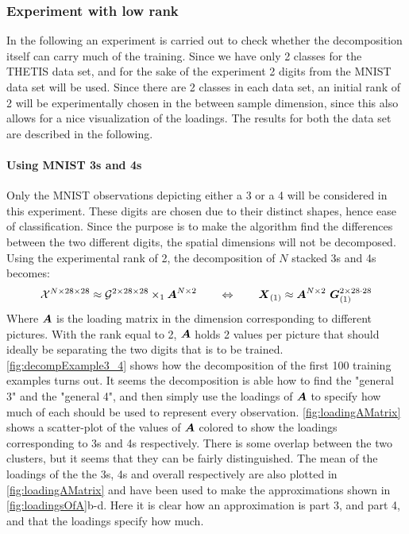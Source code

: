 \subsubsection{Experiment with low rank}
In the following an experiment is carried out to check whether the decomposition itself can carry much of the training. Since we have only 2 classes for the THETIS data set, and for the sake of the experiment 2 digits from the MNIST data set will be used. Since there are 2 classes in each data set, an initial rank of 2 will be experimentally chosen in the between sample dimension, since this also allows for a nice visualization of the loadings. The results for both the data set are described in the following.

\paragraph{Using MNIST 3s and 4s}
Only the MNIST observations depicting either a 3 or a 4 will be considered in this experiment. These digits are chosen due to their distinct shapes, hence ease of classification. Since the purpose is to make the algorithm find the differences between the two different digits, the spatial dimensions will not be decomposed. Using the experimental rank of 2, the decomposition of $N$ stacked 3s and 4s becomes:
\begin{equation}
    \tensor{X}^{N\times 28\times 28} \approx \tensor{G}^{2 \times 28 \times 28} \times_1 \bs{A}^{N\times 2} \qquad \Leftrightarrow \qquad \bs{X}_{(1)} \approx \bs{A}^{N\times 2} \ \bs{G}^{2 \times 28\cdot 28}_{(1)}
\end{equation}
Where $\boldsymbol{A}$ is the loading matrix in the dimension corresponding to different pictures. With the rank equal to 2, $\boldsymbol{A}$ holds 2 values per picture that should ideally be separating the two digits that is to be trained. \autoref{fig:decompExample3_4} shows how the decomposition of the first 100 training examples turns out. It seems the decomposition is able how to find the "general 3" and the "general 4", and then simply use the loadings of $\boldsymbol{A}$ to specify how much of each should be used to represent every observation. \autoref{fig:loadingAMatrix} shows a scatter-plot of the values of $\boldsymbol{A}$ colored to show the loadings corresponding to 3s and 4s respectively. There is some overlap between the two clusters, but it seems that they can be fairly distinguished. The mean of the loadings of the the 3s, 4s and overall respectively are also plotted in \autoref{fig:loadingAMatrix} and have been used to make the approximations shown in \autoref{fig:loadingsOfA}b-d. Here it is clear how an approximation is part 3, and part 4, and that the loadings specify how much.
